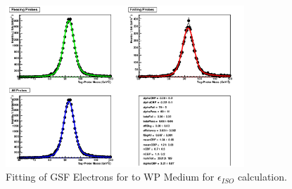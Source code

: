 \begin{figure}[htb]
\centering
\includegraphics[width=0.8\textwidth]{Systematics/2012data_outputGsfElectronToId.png}
\caption{Fitting of GSF Electrons for to WP Medium for $\epsilon_{ISO}$ calculation.}
\label{fig:2012data_outputGsfElectronToId}
\end{figure}




